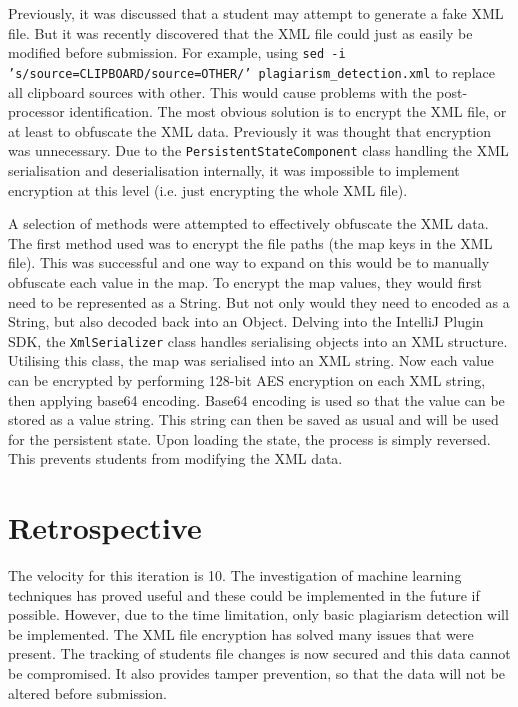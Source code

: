 Previously, it was discussed that a student may attempt to generate a fake XML file. But it was recently discovered that the XML file could just as easily be modified before submission. For example, using \texttt{sed -i 's/source=CLIPBOARD/source=OTHER/' plagiarism\_detection.xml} to replace all clipboard sources with other. This would cause problems with the post-processor identification. The most obvious solution is to encrypt the XML file, or at least to obfuscate the XML data. Previously it was thought that encryption was unnecessary. Due to the \texttt{PersistentStateComponent} class handling the XML serialisation and deserialisation internally, it was impossible to implement encryption at this level (i.e. just encrypting the whole XML file).

A selection of methods were attempted to effectively obfuscate the XML data. The first method used was to encrypt the file paths (the map keys in the XML file). This was successful and one way to expand on this would be to manually obfuscate each value in the map. To encrypt the map values, they would first need to be represented as a String. But not only would they need to encoded as a String, but also decoded back into an Object. Delving into the IntelliJ Plugin SDK, the \texttt{XmlSerializer} class handles serialising objects into an XML structure. Utilising this class, the map was serialised into an XML string. Now each value can be encrypted by performing 128-bit AES encryption on each XML string, then applying base64 encoding. Base64 encoding is used so that the value can be stored as a value string. This string can then be saved as usual and will be used for the persistent state. Upon loading the state, the process is simply reversed. This prevents students from modifying the XML data.

\section{Retrospective}
The velocity for this iteration is 10. The investigation of machine learning techniques has proved useful and these could be implemented in the future if possible. However, due to the time limitation, only basic plagiarism detection will be implemented. The XML file encryption has solved many issues that were present. The tracking of students file changes is now secured and this data cannot be compromised. It also provides tamper prevention, so that the data will not be altered before submission.
